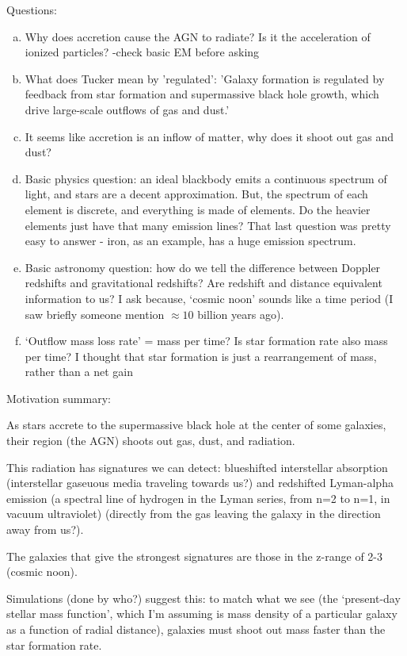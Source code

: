 \documentclass{article}
\begin{document}
Questions:
\begin{enumerate}[(a)]
    \item Why does accretion cause the AGN to radiate? Is it the acceleration of ionized particles? -check basic EM before asking
    \item What does Tucker mean by 'regulated': 'Galaxy formation is regulated by feedback from star formation and supermassive black hole growth, which drive large-scale outflows of gas and dust.'
    \item It seems like accretion is an inflow of matter, why does it shoot out gas and dust?
    \item Basic physics question: an ideal blackbody emits a continuous spectrum of light, and stars are a decent approximation. But, the spectrum of each element is discrete, and everything is made of elements. Do the heavier elements just have that many emission lines? That last question was pretty easy to answer - iron, as an example, has a huge emission spectrum.
    \item Basic astronomy question: how do we tell the difference between Doppler redshifts and gravitational redshifts? Are redshift and distance equivalent information to us? I ask because, `cosmic noon' sounds like a time period (I saw briefly someone mention $\approx 10$ billion years ago).
    \item `Outflow mass loss rate' = mass per time? Is star formation rate also mass per time? I thought that star formation is just a rearrangement of mass, rather than a net gain
\end{enumerate}
Motivation summary:

As stars accrete to the supermassive black hole at the center of some galaxies, their region (the AGN) shoots out gas, dust, and radiation.

This radiation has signatures we can detect: blueshifted interstellar absorption (interstellar gaseuous media traveling towards us?) and redshifted Lyman-alpha emission (a spectral line of hydrogen in the Lyman series, from n=2 to n=1, in vacuum ultraviolet) (directly from the gas leaving the galaxy in the direction away from us?).

The galaxies that give the strongest signatures are those in the z-range of 2-3 (cosmic noon).

Simulations (done by who?) suggest this: to match what we see (the `present-day stellar mass function', which I'm assuming is mass density of a particular galaxy as a function of radial distance), galaxies must shoot out mass faster than the star formation rate. 
\end{document}
